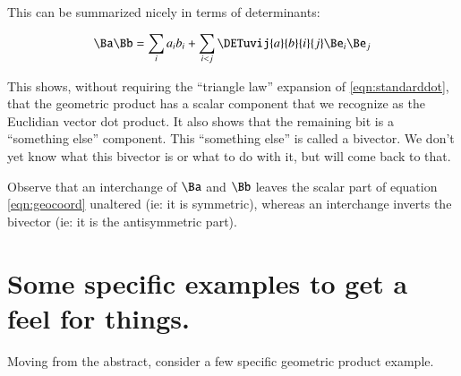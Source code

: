 \documentclass{article}      %
\begin{document}
This can be summarized nicely in terms of determinants:

\begin{equation}\label{eqn:geocoord}
\Ba\Bb = \sum_{i} {a_i b_i} + \sum_{i < j} \DETuvij{a}{b}{i}{j} \Be_i \Be_j
\end{equation}

This shows,
without requiring the ``triangle law'' expansion of \ref{eqn:standarddot},
that the geometric product has a scalar component that we recognize as the Euclidian vector dot product.  It also shows that the remaining bit 
is a ``something else'' component.  This ``something else'' is called a bivector.  We don't yet know what this bivector is or what to do with it,
but will come back to that.

Observe that an interchange of $\Ba$ and $\Bb$ leaves the scalar part of equation
\ref{eqn:geocoord} unaltered (ie: it is symmetric), whereas an interchange inverts the bivector (ie: it is the antisymmetric part).

\section{ Some specific examples to get a feel for things. }

Moving from the abstract, consider a few specific geometric product example.
\end{document}
